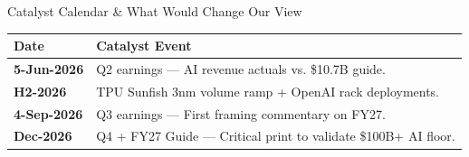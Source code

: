 \documentclass[aspectratio=169,10pt]{beamer}
\begin{document}
\begin{frame}{Catalyst Calendar \& What Would Change Our View}
  \vspace{0.5cm}
  \renewcommand{\arraystretch}{1.5}
  \begin{tabularx}{\textwidth}{@{}l X@{}}
    \toprule
    \textbf{Date} & \textbf{Catalyst Event} \\
    \midrule
    \textbf{5-Jun-2026} & Q2 earnings — AI revenue actuals vs. \$10.7B guide. \\
    \rowcolor{rowshade}\textbf{H2-2026} & TPU Sunfish 3nm volume ramp + OpenAI rack deployments. \\
    \textbf{4-Sep-2026} & Q3 earnings — First framing commentary on FY27. \\
    \rowcolor{rowshade}\textbf{Dec-2026} & Q4 + FY27 Guide — Critical print to validate \$100B+ AI floor. \\
    \bottomrule
  \end{tabularx}
  
  \vspace{0.8cm}
  \begin{center}
  \end{center}
\end{frame}
\end{document}
